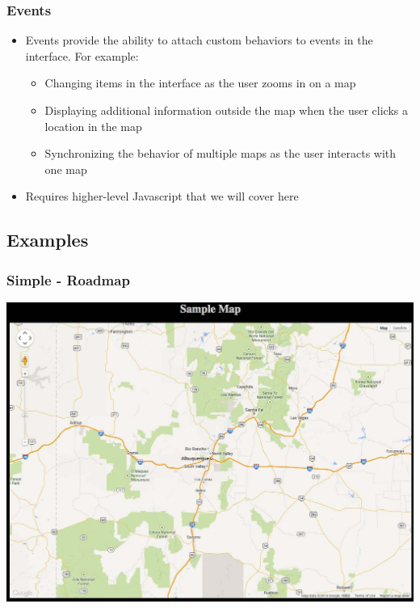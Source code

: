 \documentclass[]{article}
\begin{document}
\subsubsection{Events}\label{events}

\begin{itemize}
\itemsep1pt\parskip0pt
\item
  Events provide the ability to attach custom behaviors to events in the
  interface. For example:

  \begin{itemize}
  \itemsep1pt\parskip0pt
  \item
    Changing items in the interface as the user zooms in on a map
  \item
    Displaying additional information outside the map when the user
    clicks a location in the map
  \item
    Synchronizing the behavior of multiple maps as the user interacts
    with one map
  \end{itemize}
\item
  Requires higher-level Javascript that we will cover here
\end{itemize}

\subsection{Examples}\label{examples}

\subsubsection{Simple - Roadmap}\label{simple---roadmap}

\includegraphics{images/google_01.jpg}~
\end{document}
